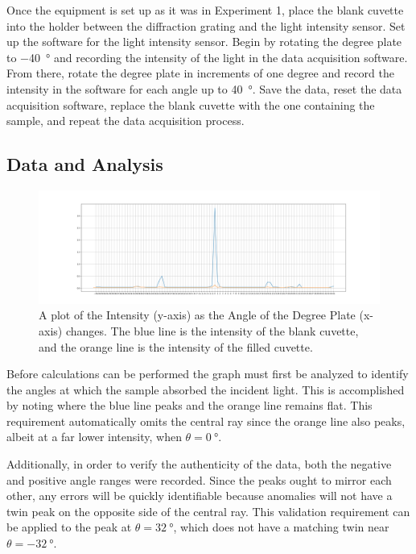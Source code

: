 \documentclass{article}
\begin{document}
\qq Once the equipment is set up as it was in Experiment 1, place the blank
cuvette into the holder between the diffraction grating and the light intensity
sensor. Set up the software for the light intensity sensor. Begin by rotating
the degree plate to \SI{-40}{\degree} and recording the intensity of the light in
the data acquisition software. From there, rotate the degree plate in increments
of one degree and record the intensity in the software for each angle up to
\SI{40}{\degree}. Save the data, reset the data acquisition software, replace
the blank cuvette with the one containing the sample, and repeat the data
acquisition process.

\subsection{Data and Analysis}

\begin{figure}[H]
  \label{gph:exp2data}
  \begin{adjustwidth}{-5cm}{}
    \begin{center}
      \includegraphics[scale=0.35]{exp2.jpg}
    \end{center}
  \end{adjustwidth}
  \caption{A plot of the Intensity (y-axis) as the Angle of the Degree Plate
    (x-axis) changes. The blue line is the intensity of the blank cuvette, and
    the orange line is the intensity of the filled cuvette.}
\end{figure}

\qq Before calculations can be performed the graph must first be analyzed to
identify the angles at which the sample absorbed the incident light. This is
accomplished by noting where the blue line peaks and the orange line remains
flat. This requirement automatically omits the central ray since the orange line
also peaks, albeit at a far lower intensity, when \(\theta =
\SI{0}{\degree}\). 

\qq Additionally, in order to verify the authenticity of the data, both the
negative and positive angle ranges were recorded. Since the peaks ought to
mirror each other, any errors will be quickly identifiable because anomalies
will not have a twin peak on the opposite side of the central ray. This
validation requirement can be applied to the peak at \(\theta =
\SI{32}{\degree}\), which does not have a matching twin near \(\theta =
\SI{-32}{\degree}\).  
\end{document}
